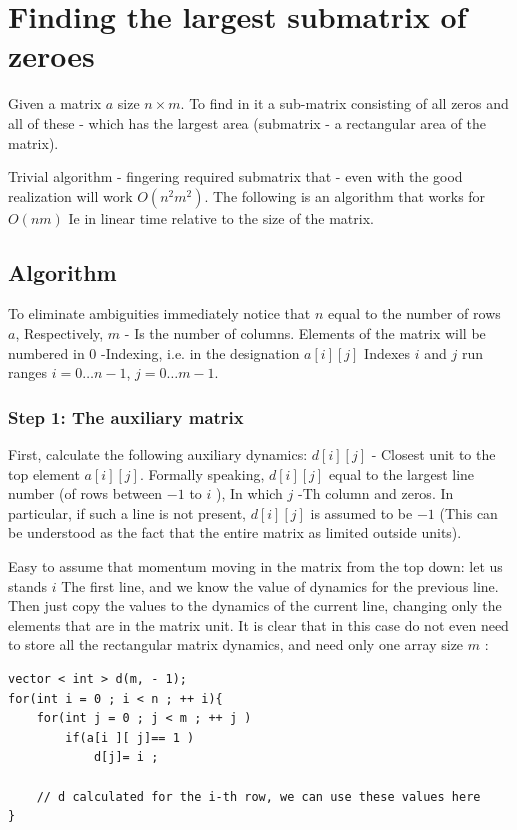 \section{ Finding the largest submatrix of zeroes }
Given a matrix $a$ size $n \times m$. To find in it a sub-matrix consisting of all zeros and all of these - which has the largest area (submatrix - a rectangular area of ​​the matrix).

Trivial algorithm - fingering required submatrix that - even with the good realization will work $O (n ^ 2 m ^ 2)$. The following is an algorithm that works for $O (n m)$ Ie in linear time relative to the size of the matrix.

\subsection{ Algorithm }

To eliminate ambiguities immediately notice that $n$ equal to the number of rows $a$, Respectively, $m$ - Is the number of columns. Elements of the matrix will be numbered in $0$ -Indexing, i.e. in the designation $a [i][j]$ Indexes $i$ and $j$ run ranges $i = 0 \ldots n-1$, $j = 0 \ldots m-1$.

\subsubsection{ Step 1: The auxiliary matrix }

First, calculate the following auxiliary dynamics: $d [i][j]$ - Closest unit to the top element $a [i][j]$. Formally speaking, $d [i][j]$ equal to the largest line number (of rows between $-1$ to $i$ ), In which $j$ -Th column and zeros. In particular, if such a line is not present, $d [i][j]$ is assumed to be $-1$ (This can be understood as the fact that the entire matrix as limited outside units).

Easy to assume that momentum moving in the matrix from the top down: let us stands $i$ The first line, and we know the value of dynamics for the previous line. Then just copy the values ​​to the dynamics of the current line, changing only the elements that are in the matrix unit. It is clear that in this case do not even need to store all the rectangular matrix dynamics, and need only one array size $m$ :

\begin{verbatim}
vector < int > d(m, - 1);
for(int i = 0 ; i < n ; ++ i){
    for(int j = 0 ; j < m ; ++ j )
        if(a[i ][ j]== 1 )
            d[j]= i ;
 
    // d calculated for the i-th row, we can use these values ​​here
} 
\end{verbatim}

